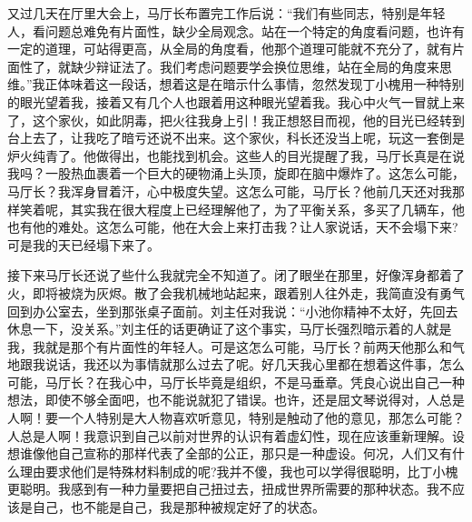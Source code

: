 \documentclass[12pt,oneside]{book}
\begin{document}
又过几天在厅里大会上，马厅长布置完工作后说：``我们有些同志，特别是年轻人，看问题总难免有片面性，缺少全局观念。站在一个特定的角度看问题，也许有一定的道理，可站得更高，从全局的角度看，他那个道理可能就不充分了，就有片面性了，就缺少辩证法了。我们考虑问题要学会换位思维，站在全局的角度来思维。''我正体味着这一段话，想着这是在暗示什么事情，忽然发现丁小槐用一种特别的眼光望着我，接着又有几个人也跟着用这种眼光望着我。我心中火气一冒就上来了，这个家伙，如此阴毒，把火往我身上引！我正想怒目而视，他的目光已经转到台上去了，让我吃了暗亏还说不出来。这个家伙，科长还没当上呢，玩这一套倒是炉火纯青了。他做得出，也能找到机会。这些人的目光提醒了我，马厅长真是在说我吗？一股热血裹着一个巨大的硬物涌上头顶，旋即在脑中爆炸了。这怎么可能，马厅长？我浑身冒着汗，心中极度失望。这怎么可能，马厅长？他前几天还对我那样笑着呢，其实我在很大程度上已经理解他了，为了平衡关系，多买了几辆车，他也有他的难处。这怎么可能，他在大会上来打击我？让人家说话，天不会塌下来?可是我的天已经塌下来了。

接下来马厅长还说了些什么我就完全不知道了。闭了眼坐在那里，好像浑身都着了火，即将被烧为灰烬。散了会我机械地站起来，跟着别人往外走，我简直没有勇气回到办公室去，坐到那张桌子面前。刘主任对我说：``小池你精神不太好，先回去休息一下，没关系。''刘主任的话更确证了这个事实，马厅长强烈暗示着的人就是我，我就是那个有片面性的年轻人。可是这怎么可能，马厅长？前两天他那么和气地跟我说话，我还以为事情就那么过去了呢。好几天我心里都在想着这件事，怎么可能，马厅长？在我心中，马厅长毕竟是组织，不是马垂章。凭良心说出自己一种想法，即使不够全面吧，也不能说就犯了错误。也许，还是屈文琴说得对，人总是人啊！要一个人特别是大人物喜欢听意见，特别是触动了他的意见，那怎么可能？人总是人啊！我意识到自己以前对世界的认识有着虚幻性，现在应该重新理解。设想谁像他自己宣称的那样代表了全部的公正，那只是一种虚设。何况，人们又有什么理由要求他们是特殊材料制成的呢?我并不傻，我也可以学得很聪明，比丁小槐更聪明。我感到有一种力量要把自己扭过去，扭成世界所需要的那种状态。我不应该是自己，也不能是自己，我是那种被规定好了的状态。
\end{document}
